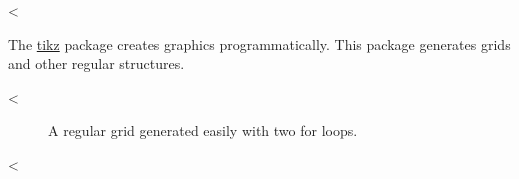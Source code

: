 <%

The \href{https://ctan.org/pkg/pgf}{tikz} package creates graphics programmatically.
This package generates grids and other regular structures.

<%
\begin{figure}[ht]
  \centering
  \caption{A regular grid generated easily with two for loops.}\label{fig:tikz_example}
\end{figure}
<%
